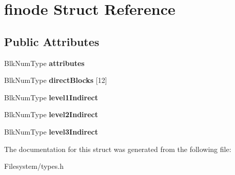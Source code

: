 \hypertarget{structfinode}{}\section{finode Struct Reference}
\label{structfinode}
\subsection*{Public Attributes}
\begin{DoxyCompactItemize}
\item 
\mbox{\label{structfinode_acea49fb643c2e6a421d4d4ed674fe2c8}} 
Blk\+Num\+Type {\bfseries attributes}
\item 
\mbox{\label{structfinode_ad2e7c7bf4f5653afac46fb609f4a04bd}} 
Blk\+Num\+Type {\bfseries direct\+Blocks} \mbox{[}12\mbox{]}
\item 
\mbox{\label{structfinode_a0d707b42974c4777cd5ff71e3b70ed5a}} 
Blk\+Num\+Type {\bfseries level1\+Indirect}
\item 
\mbox{\label{structfinode_a758697bad925160db4e1e08b1d51550c}} 
Blk\+Num\+Type {\bfseries level2\+Indirect}
\item 
\mbox{\label{structfinode_a6c3fe6a69987a36fdfeae3acc8904edb}} 
Blk\+Num\+Type {\bfseries level3\+Indirect}
\end{DoxyCompactItemize}


The documentation for this struct was generated from the following file\+:\begin{DoxyCompactItemize}
\item 
Filesystem/types.\+h\end{DoxyCompactItemize}
